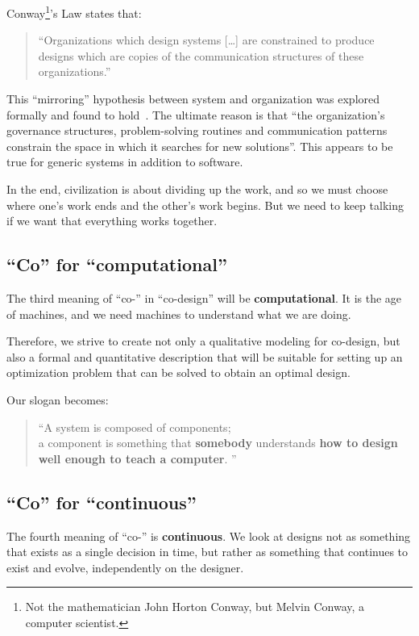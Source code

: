 Conway\footnote{Not the mathematician John Horton Conway, but Melvin Conway, a computer scientist.
}'s Law states that:

\begin{quote}
    \enquote{Organizations which design systems [\dots] are constrained to produce designs which are copies of the communication structures of these organizations.}
\end{quote}

This ``mirroring'' hypothesis between system and organization was explored formally and found to hold~\cite{maccormack12exploring}.
The ultimate reason is that ``the organization's governance structures, problem-solving routines and communication patterns constrain the space in which it searches for new solutions''.
This appears to be true for generic systems in addition to software.

In the end, civilization is about dividing up the work, and so we must choose where one's work ends and the other's work begins.
But we need to keep talking if we want that everything works together.

\subsection{``Co'' for ``computational''}

The third meaning of ``co-'' in ``co-design'' will be \textbf{computational}.
It is the age of machines, and we need machines to understand what we are doing.

Therefore, we strive to create not only a qualitative modeling for co-design, but also a formal and quantitative description that will be suitable for setting up an optimization problem that can be solved to obtain an optimal design.

Our slogan becomes:

\begin{quote}
    \enquote{A system is composed of components;\\
        a component is something that \textbf{somebody} understands
        \textbf{how to design} \textbf{well enough to teach a computer}.
    }
\end{quote}

\subsection{``Co'' for ``continuous''}

The fourth meaning of ``co-'' is \textbf{continuous}.
We look at designs not as something that exists as a single decision in time, but rather as something that continues to exist and evolve, independently on the designer.


